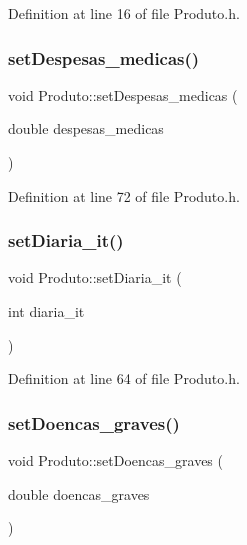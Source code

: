 Definition at line 16 of file Produto.\+h.

\hypertarget{class_produto_a8480cf3984c1298167fac87e079b10ca}{}\label{class_produto_a8480cf3984c1298167fac87e079b10ca} 
\subsubsection{\texorpdfstring{set\+Despesas\+\_\+medicas()}{setDespesas\_medicas()}}
{\footnotesize\ttfamily void Produto\+::set\+Despesas\+\_\+medicas (\begin{DoxyParamCaption}\item[{double}]{despesas\+\_\+medicas }\end{DoxyParamCaption})\hspace{0.3cm}{\ttfamily [inline]}}



Definition at line 72 of file Produto.\+h.

\hypertarget{class_produto_a4546d6f5d6a517bcecc6decc9bea50f8}{}\label{class_produto_a4546d6f5d6a517bcecc6decc9bea50f8} 
\subsubsection{\texorpdfstring{set\+Diaria\+\_\+it()}{setDiaria\_it()}}
{\footnotesize\ttfamily void Produto\+::set\+Diaria\+\_\+it (\begin{DoxyParamCaption}\item[{int}]{diaria\+\_\+it }\end{DoxyParamCaption})\hspace{0.3cm}{\ttfamily [inline]}}



Definition at line 64 of file Produto.\+h.

\hypertarget{class_produto_ab53115d44dbb7856030aba832edd21bf}{}\label{class_produto_ab53115d44dbb7856030aba832edd21bf} 
\subsubsection{\texorpdfstring{set\+Doencas\+\_\+graves()}{setDoencas\_graves()}}
{\footnotesize\ttfamily void Produto\+::set\+Doencas\+\_\+graves (\begin{DoxyParamCaption}\item[{double}]{doencas\+\_\+graves }\end{DoxyParamCaption})\hspace{0.3cm}{\ttfamily [inline]}}



